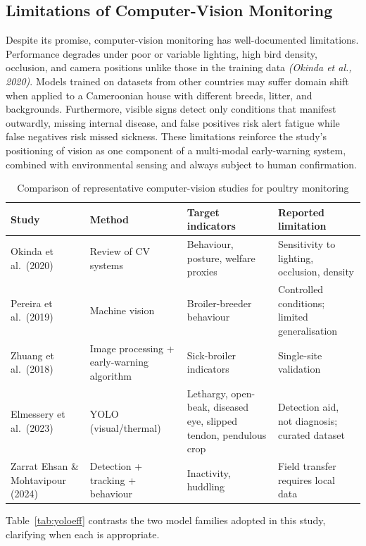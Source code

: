 \documentclass[12pt,a4paper]{report}
\begin{document}
\subsection{Limitations of Computer-Vision Monitoring}

Despite its promise, computer-vision monitoring has well-documented limitations. Performance degrades under poor or variable lighting, high bird density, occlusion, and camera positions unlike those in the training data \textit{(Okinda et al., 2020)}. Models trained on datasets from other countries may suffer domain shift when applied to a Cameroonian house with different breeds, litter, and backgrounds. Furthermore, visible signs detect only conditions that manifest outwardly, missing internal disease, and false positives risk alert fatigue while false negatives risk missed sickness. These limitations reinforce the study's positioning of vision as one component of a multi-modal early-warning system, combined with environmental sensing and always subject to human confirmation.

\begin{table}[tbp]
\caption{Comparison of representative computer-vision studies for poultry monitoring}
\label{tab:cvstudies}
\centering
\small
\begin{tabularx}{\textwidth}{|X|l|X|X|}
\hline
\rowcolor{headerblue}
\textbf{Study} & \textbf{Method} & \textbf{Target indicators} & \textbf{Reported limitation} \\
\hline
Okinda et al.\ (2020) & Review of CV systems & Behaviour, posture, welfare proxies & Sensitivity to lighting, occlusion, density \\
\hline
Pereira et al.\ (2019) & Machine vision & Broiler-breeder behaviour & Controlled conditions; limited generalisation \\
\hline
Zhuang et al.\ (2018) & Image processing + early-warning algorithm & Sick-broiler indicators & Single-site validation \\
\hline
Elmessery et al.\ (2023) & YOLO (visual/thermal) & Lethargy, open-beak, diseased eye, slipped tendon, pendulous crop & Detection aid, not diagnosis; curated dataset \\
\hline
Zarrat Ehsan \& Mohtavipour (2024) & Detection + tracking + behaviour & Inactivity, huddling & Field transfer requires local data \\
\hline
\end{tabularx}
\end{table}

Table~\ref{tab:yoloeff} contrasts the two model families adopted in this study, clarifying when each is appropriate.
\end{document}
